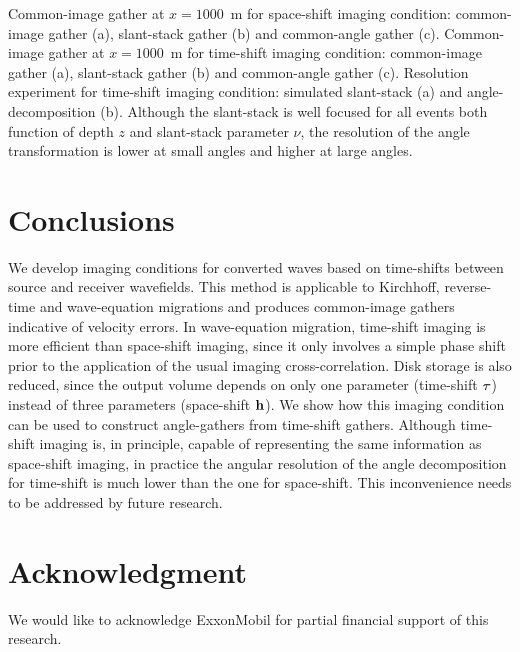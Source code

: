 {Common-image gather at $x=1000$~m for space-shift imaging condition:
common-image gather (a),
slant-stack gather (b) and
common-angle gather (c).}
{Common-image gather at $x=1000$~m for time-shift imaging condition:
common-image gather (a),
slant-stack gather (b) and
common-angle gather (c).}
{Resolution experiment for time-shift imaging condition:
simulated slant-stack (a) and
angle-decomposition (b).
Although the slant-stack is well focused for all events 
both function of  depth $z$ and slant-stack parameter $\nu$, 
the resolution of the angle transformation is lower at small 
angles and higher at large angles.
}

\section{Conclusions}
We develop imaging conditions for converted waves
based on time-shifts between source and receiver wavefields.
This method is applicable to Kirchhoff, reverse-time and
wave-equation migrations and produces common-image gathers
indicative of velocity errors.
In wave-equation migration, time-shift imaging is
more efficient than space-shift imaging, since it only involves
a simple phase shift prior to the application
of the usual imaging cross-correlation.
Disk storage is also reduced, since the output volume
depends on only one parameter (time-shift $\tt$) instead
of three parameters (space-shift $\hh$).
We show how this imaging condition can be used to
construct angle-gathers from time-shift gathers.
Although time-shift imaging is, in principle, capable of 
representing the same information as space-shift imaging,
in practice the angular resolution of the angle decomposition for
time-shift is much lower than the one for space-shift.
This inconvenience needs to be addressed by future research.

\section{Acknowledgment}
We would like to acknowledge ExxonMobil for partial financial support
of this research.




